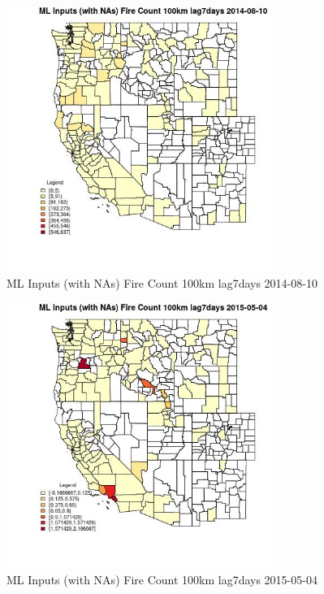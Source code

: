 \begin{figure} 
\centering  
\includegraphics[width=0.77\textwidth]{Code_Outputs/Report_ML_input_PM25_Step4_part_e_de_duplicated_aves_compiled_2019-05-18wNAs_CountyFire_Count_100km_lag7daysMean2014-08-10.jpg} 
\caption{\label{fig:Report_ML_input_PM25_Step4_part_e_de_duplicated_aves_compiled_2019-05-18wNAsCountyFire_Count_100km_lag7daysMean2014-08-10}ML Inputs (with NAs) Fire Count 100km lag7days 2014-08-10} 
\end{figure} 
 

\begin{figure} 
\centering  
\includegraphics[width=0.77\textwidth]{Code_Outputs/Report_ML_input_PM25_Step4_part_e_de_duplicated_aves_compiled_2019-05-18wNAs_CountyFire_Count_100km_lag7daysMean2015-05-04.jpg} 
\caption{\label{fig:Report_ML_input_PM25_Step4_part_e_de_duplicated_aves_compiled_2019-05-18wNAsCountyFire_Count_100km_lag7daysMean2015-05-04}ML Inputs (with NAs) Fire Count 100km lag7days 2015-05-04} 
\end{figure} 
 

